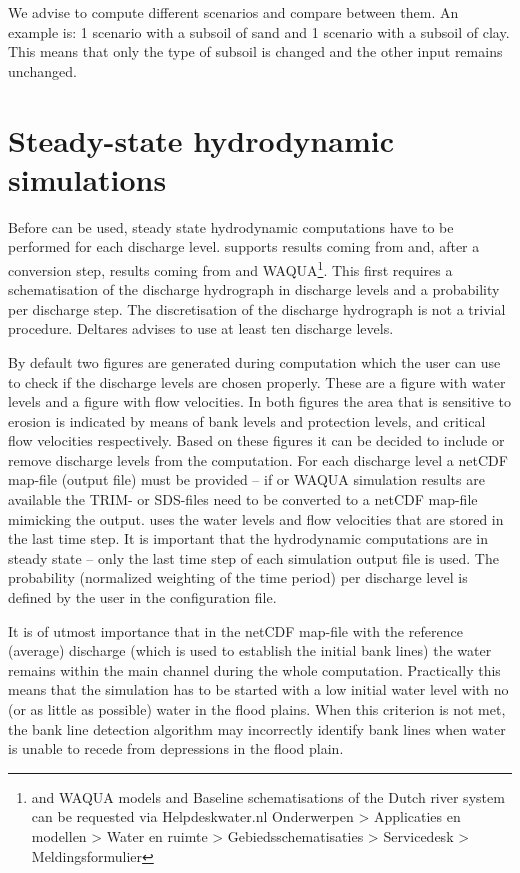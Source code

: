 We advise to compute different scenarios and compare between them.
An example is: 1 scenario with a subsoil of sand and 1 scenario with a subsoil of clay.
This means that only the type of subsoil is changed and the other input remains unchanged.

\section{Steady-state hydrodynamic simulations}

Before \dfastbe can be used, steady state hydrodynamic computations have to be performed for each discharge level.
\dfastbe supports results coming from \dflowfm and, after a conversion step, results coming from \dflow and WAQUA\footnote{\dflowfm and WAQUA models and Baseline schematisations of the Dutch river system can be requested via Helpdeskwater.nl Onderwerpen > Applicaties en modellen > Water en ruimte > Gebiedsschematisaties > Servicedesk > Meldingsformulier}.
This first requires a schematisation of the discharge hydrograph in discharge levels and a probability per discharge step.
The discretisation of the discharge hydrograph is not a trivial procedure.
Deltares advises to use at least ten discharge levels.

By default two figures are generated during \dfastbe computation which the user can use to check if the discharge levels are chosen properly.
These are a figure with water levels and a figure with flow velocities.
In both figures the area that is sensitive to erosion is indicated by means of bank levels and protection levels, and critical flow velocities respectively.
Based on these figures it can be decided to include or remove discharge levels from the computation.
For each discharge level a netCDF map-file (\dflowfm output file) must be provided -- if \dflow or WAQUA simulation results are available the TRIM- or SDS-files need to be converted to a netCDF map-file mimicking the \dflowfm output.
\dfastbe uses the water levels and flow velocities that are stored in the last time step.
It is important that the hydrodynamic computations are in steady state -- only the last time step of each simulation output file is used.
The probability (normalized weighting of the time period) per discharge level is defined by the user in the configuration file.

\Note It is of utmost importance that in the netCDF map-file with the reference (average) discharge (which is used to establish the initial bank lines) the water remains within the main channel during the whole computation.
Practically this means that the simulation has to be started with a low initial water level with no (or as little as possible) water in the flood plains.
When this criterion is not met, the bank line detection algorithm may incorrectly identify bank lines when water is unable to recede from depressions in the flood plain.

